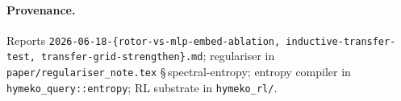 \documentclass[11pt, a4paper]{article}
\begin{document}
\paragraph{Provenance.} Reports \texttt{2026-06-18-\{rotor-vs-mlp-embed-ablation,
inductive-transfer-test, transfer-grid-strengthen\}.md}; regulariser in
\texttt{paper/regulariser\_note.tex} \S\,spectral-entropy; entropy compiler in
\texttt{hymeko\_query::entropy}; RL substrate in \texttt{hymeko\_rl/}.
\end{document}
